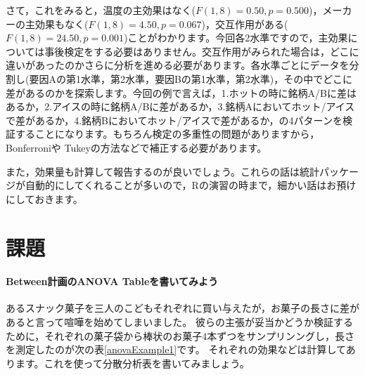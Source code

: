 \documentclass{ltjbook}
\begin{document}
		さて，これをみると，温度の主効果はなく($F(1,8)=0.50,p=0.500$)，メーカーの主効果もなく($F(1,8)=4.50,p=0.067$)，交互作用がある($F(1,8)=24.50,p=0.001$)ことがわかります。今回各2水準ですので，主効果については事後検定をする必要はありません。交互作用がみられた場合は，どこに違いがあったのかさらに分析を進める必要があります。各水準ごとにデータを分割し(要因Aの第1水準，第2水準，要因Bの第1水準，第2水準)，その中でどこに差があるのかを探索します。今回の例で言えば，1.ホットの時に銘柄A/Bに差はあるか，2.アイスの時に銘柄A/Bに差があるか，3.銘柄Aにおいてホット/アイスで差があるか，4.銘柄Bにおいてホット/アイスで差があるか，の4パターンを検証することになります。もちろん検定の多重性の問題がありますから，Bonferroniや Tukeyの方法などで補正する必要があります。

また，効果量も計算して報告するのが良いでしょう。これらの話は統計パッケージが自動的にしてくれることが多いので，Rの演習の時まで，細かい話はお預けにしておきます。
\section{課題}

\paragraph{Between計画のANOVA Tableを書いてみよう}あるスナック菓子を三人のこどもそれぞれに買い与えたが，お菓子の長さに差があると言って喧嘩を始めてしまいました。
彼らの主張が妥当かどうか検証するために，それぞれの菓子袋から棒状のお菓子4本ずつをサンプリンングし，長さを測定したのが次の表\ref{anovaExample1}です。
それぞれの効果などは計算してあります。これを使って分散分析表を書いてみましょう。
\end{document}

